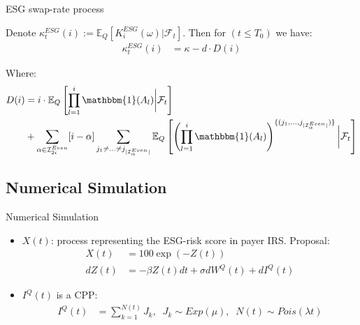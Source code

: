 \documentclass[UKenglish]{beamer}
\newcommand{\E}{\mathbb{E}}  %
\newcommand{\F}{\mathcal{F}} %
\begin{document}
\begin{frame}{ESG swap-rate process}
\begin{proposition}[Swap rate process $\kappa_{t}^{ESG} = (\kappa_{t}^{ESG}(i))_{i\in \mathcal{I}_{n}}$]
Denote $\kappa_{t}^{ESG}(i) := \E_{Q}[K_{i}^{ESG}(\omega)|\F_{t}]$. 
Then for $(t\leq T_{0})$ we have: 
\begin{align*}
\kappa_{t}^{ESG}(i)
&= 
\kappa -d\cdot D(i)
\end{align*}

Where: 
\begin{align*}
 D(i) &= 
i\cdot \E_{Q}\left[
\prod_{l=1}^{i}\mathbbm{1}(A_{l})\bigg{|}\F_{t}
\right] \\
&+ 
\sum_{\alpha \in \mathcal{I}_{2i}^{Even}}[i-\alpha]
\sum_{
j_{1}\neq \dots \neq j_{|\mathcal{I}_{\alpha}^{Even}|}
}
\E_{Q}\left[
\left(
\prod_{l=1}^{i}\mathbbm{1}(A_{l})
\right)^{
\{
(j_{1}, \dots , j_{|\mathcal{I}_{\alpha}^{Even}|})
\}
}
\bigg{|}\F_{t}
\right]   
\end{align*}
\end{proposition}
\end{frame}



\subsection{Numerical Simulation}
\begin{frame}{Numerical Simulation}
\begin{itemize}
    \item $X(t)$: process representing the ESG-risk score in payer IRS. Proposal: 
    \begin{align*}
    X(t) &= 100\exp(-Z(t)) \\
    dZ(t) &= -\beta Z(t)dt + \sigma dW^{Q}(t) + dI^{Q}(t)
    \end{align*}
    \item $I^{Q}(t)$ is a CPP:
    \begin{align*}
    I^{Q}(t) &= \sum_{k=1}^{N(t)}J_{k}, \;\; J_{k}\sim  Exp(\mu),\;\; N(t) \sim Pois(\lambda t)    
\end{align*} 
\end{itemize}   
\end{frame}
\end{document}
